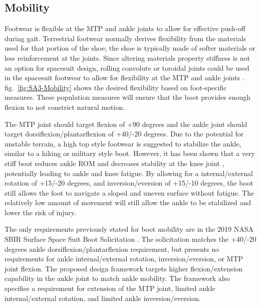\documentclass[defaultstyle,11pt]{comps}
\begin{document}
\hypertarget{mobility}{%
\subsection{Mobility}\label{mobility}}

Footwear is flexible at the MTP and ankle joints to allow for effective push-off during gait. Terrestrial footwear normally derives flexibility from the materials used for that portion of the shoe; the shoe is typically made of softer materials or less reinforcement at the joints. Since altering materials property stiffness is not an option for spacesuit design, rolling convolute or toroidal joints could be used in the spacesuit footwear to allow for flexibility at the MTP and ankle joints \citep{Harris2001}. fig.~\ref{fig:SA3-Mobility} shows the desired flexibility based on foot-specific measures. These population measures will ensure that the boot provides enough flexion to not constrict natural motion.

The MTP joint should target flexion of +90 degrees and the ankle joint should target dorsiflexion/plantarflexion of +40/-20 degrees.
Due to the potential for unstable terrain, a high top style footwear is suggested to stabilize the ankle, similar to a hiking or military style boot.
However, it has been shown that a very stiff boot reduces ankle ROM and decreases stability at the knee joint \citep{Bohm2010}, potentially leading to ankle and knee fatigue.
By allowing for a internal/external rotation of +15/-20 degrees, and inversion/eversion of +15/-10 degrees, the boot still allows the foot to navigate a sloped and uneven surface without fatigue.
The relatively low amount of movement will still allow the ankle to be stabilized and lower the risk of injury.

The only requirements previously stated for boot mobility are in the 2019 NASA SBIR Surface Space Suit Boot Solicitation \citep{NASA2019}.
The solicitation matches the +40/-20 degrees ankle dorsiflexion/plantarflexion requirement, but presents no requirements for ankle internal/external rotation, inversion/eversion, or MTP joint flexion.
The proposed design framework targets higher flexion/extension capability in the ankle joint to match ankle mobility.
The framework also specifies a requirement for extension of the MTP joint, limited ankle internal/external rotation, and limited ankle inversion/eversion.
\end{document}
